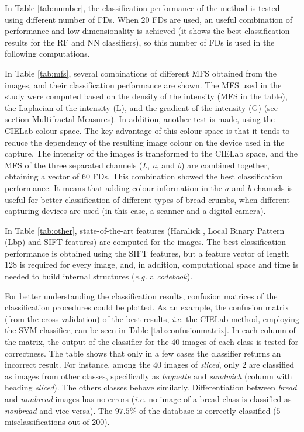\documentclass[spanish,a4paper,11pt,oneside,links]{report}
\begin{document}
In Table \ref{tab:number}, the classification performance of the method is tested using different number of FDs. When $20$ FDs are used, an useful combination of performance and low-di\-men\-sio\-na\-li\-ty is achieved (it shows the best classification results for the RF and NN classifiers), so this number of FDs is used in the following computations. 

In Table \ref{tab:mfs}, several combinations of different MFS obtained from the images, and their classification performance are shown. The MFS used in the study were computed based on the density of the intensity (MFS in the table), the Laplacian of the intensity (L), and the gradient of the intensity (G) (see section Multifractal Measures). In addition, another test is made, using the CIELab \cite{Hunter58} colour space. The key advantage of this colour space is that it tends to reduce the dependency of the resulting image colour on the device used in the capture. The intensity of the images is transformed to the CIELab space, and the MFS of the three separated channels ({\em L}, {\em a}, and {\em b}) are combined together, obtaining a vector of $60$ FDs. This combination showed the best classification performance. It means that adding colour information in the $a$ and $b$ channels is useful for better classification of different types of bread crumbs, when different capturing devices are used (in this case, a scanner and a digital camera).

In Table \ref{tab:other}, state-of-the-art features (Haralick \cite{Haralick73}, Local Binary Pattern (Lbp) \cite{Ojala96} and SIFT \cite{Lowe2004} features) are computed for the images. The best classification performance is obtained using the SIFT features, but a feature vector of length 128 is required for every image, and, in addition, computational space and time is needed to build internal structures ({\em e.g.} a {\em codebook}). 

For better understanding the classification results, confusion matrices of the classification procedures could be plotted. As an example, the confusion matrix (from the cross validation) of the best results, {\em i.e.} the CIELab method, employing the SVM classifier, can be seen in Table \ref{tab:confusionmatrix}. In each column of the matrix, the output of the classifier for the $40$ images of each class is tested for correctness. The table shows that only in a few cases the classifier returns an incorrect result. For instance, among the $40$ images of {\em sliced}, only $2$ are  classified as images from other classes, specifically as {\em baguette} and {\em sandwich} (column with heading {\em sliced}). The others classes behave similarly. Differentiation between {\em bread} and {\em nonbread} images has no errors ({\em i.e.} no image of a bread class is classified as {\em nonbread} and vice versa). The $97.5\%$ of the database is correctly classified ($5$ misclassifications out of $200$).
\end{document}
